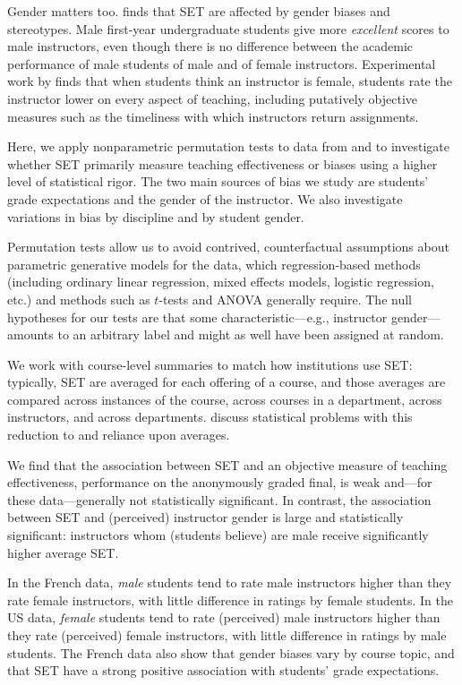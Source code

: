 \documentclass[12pt]{article}
\begin{document}
Gender matters too.
\citet{Boring2015} finds that SET are affected by gender biases and stereotypes. 
Male first-year undergraduate students give more \emph{excellent} scores to male instructors,
even though there is no difference between
the academic performance of male students of male and of female instructors.
Experimental work by \citet{MacNell2014} finds that when students think
an instructor is female,
students rate the instructor lower on every aspect of teaching,
including putatively objective measures such as the timeliness with which instructors
return assignments.

Here, we apply nonparametric permutation tests to data from \citet{Boring2015} and 
\citet{MacNell2014} to investigate whether SET primarily measure teaching effectiveness or 
biases using a higher level of statistical rigor.
The two main sources of bias we study are students' grade expectations and the gender of the 
instructor. 
We also investigate variations in bias by discipline and by student gender.

Permutation tests allow us to avoid 
contrived, counterfactual assumptions about
parametric generative models for the data, which regression-based methods (including
ordinary linear regression, mixed effects models, logistic regression, etc.) and
methods such as $t$-tests and ANOVA generally require.
The null hypotheses for our tests are that some 
characteristic---e.g., instructor gender---amounts to an arbitrary label and might as well
have been assigned at random. 

We work with course-level summaries to match how institutions use SET: 
typically, SET are averaged for each offering of a course, and those averages are 
compared across instances of the course,
across courses in a department, across instructors, and across departments.
\citet{StarkFreishtat2014} discuss statistical problems with this reduction to 
and reliance upon averages.

We find that the association between SET and an objective measure of teaching effectiveness,
performance on the anonymously graded final, 
is weak and---for these data---generally not statistically significant.
In contrast, the association between SET and (perceived) instructor gender 
is large and statistically significant:
instructors whom (students believe) are male receive significantly higher average SET.

In the French data, \emph{male} students tend to rate male instructors higher
than they rate female instructors, with little difference in ratings by female students.
In the US data, \emph{female} students tend to rate (perceived) male instructors 
higher than they rate (perceived) female instructors, with little difference in ratings by male students. 
The French data also show that gender biases vary by course topic, and 
that SET have a strong positive association with students' grade expectations.
\end{document}
